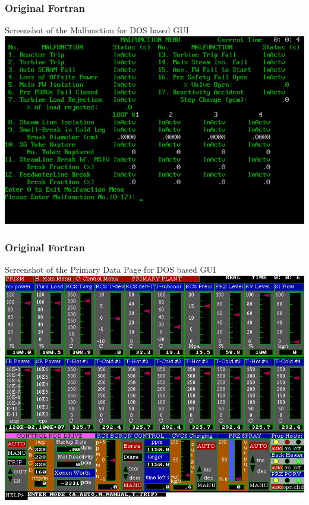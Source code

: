 \documentclass[fleqn]{beamer}
\begin{document}
    \begin{frame}
        \frametitle{Original Fortran}
        \begin{center}
            Screenshot of the Malfunction for DOS based GUI 
            \includegraphics[totalheight=.8\textheight]{prism2}
        \end{center}
    \end{frame}
    
    \begin{frame}
        \frametitle{Original Fortran}
        \begin{center}
            Screenshot of the Primary Data Page for DOS based GUI 
            \includegraphics[totalheight=.8\textheight]{prism3}
        \end{center}
    \end{frame}
    
\end{document}
